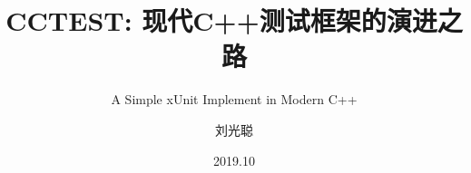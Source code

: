 \title[cctest]
{CCTEST: 现代C++测试框架的演进之路}

\subtitle{A Simple xUnit Implement in Modern C++}

\author[刘光聪]
{ 刘光聪
}


\date[2019-10-10]{2019.10}